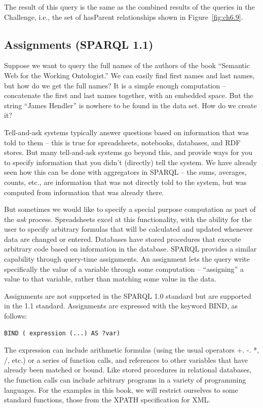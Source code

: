 The result of this query is the same as the combined results of the
queries in the Challenge, i.e., the set of hasParent relationships shown
in Figure~\ref{fig:ch6.9}.

\subsection{Assignments (SPARQL 1.1)}
\label{assignments}

Suppose we want to query the full names of the authors of the book
``Semantic Web for the Working Ontologist.'' We can easily find first
names and last names, but how do we get the full names? It is a simple
enough computation -- concatenate the first and last names together,
with an embedded space. But the string ``James Hendler'' is nowhere to
be found in the data set. How do we create it?

Tell-and-ask systems typically answer questions based on information
that was told to them -- this is true for spreadsheets, notebooks,
databases, and RDF stores. But many tell-and-ask systems go
beyond this, and provide ways for you to specify information that you
didn't (directly) tell the system. We have already seen how this can be
done with aggregators in SPARQL -- the sums, averages, counts, etc., are
information that was not directly told to the system, but was computed
from information that was already there.

But sometimes we would like to specify a special purpose computation as
part of the \emph{ask} process. Spreadsheets excel at this functionality, with
the ability for the user to specify arbitrary formulas that will be
calculated and updated whenever data are changed or entered. Databases
have stored procedures that execute arbitrary code based on information
in the database. SPARQL provides a similar capability through query-time
assignments. An assignment lets the query write specifically the value
of a variable through some computation -- ``assigning'' a value to that
variable, rather than matching some value in the data.

Assignments are not supported in the SPARQL 1.0 standard but are
supported in the 1.1 standard. Assignments are expressed with the
keyword BIND,  as follows:

\begin{lstlisting}
BIND ( expression (...) AS ?var)
\end{lstlisting}

The expression can include arithmetic formulas (using the usual
operators +. -. *, /, etc.) or a series of function calls, and references to other variables
that have already been matched or bound. Like stored
procedures in relational databases, the function calls can include
arbitrary programs in a variety of programming languages. For the
examples in this book, we will restrict ourselves to some standard
functions, those from the XPATH specification for XML.

